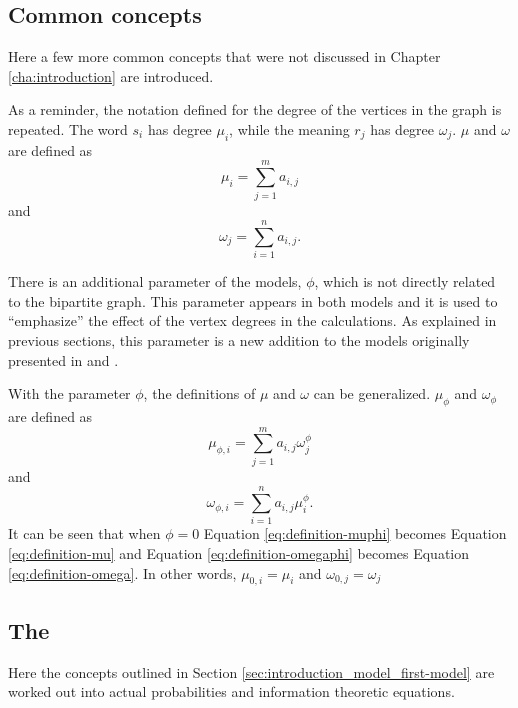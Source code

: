 \subsection{Common concepts}
\label{sec:model_math_graph}

Here a few more common concepts that were not discussed in Chapter \ref{cha:introduction} are introduced.

As a reminder, the notation defined for the degree of the vertices in the graph is repeated.
The word $s_i$ has degree $\mu_i$, while the meaning $r_j$ has degree $\omega_j$.
$\mu$ and $\omega$ are defined as
\begin{equation}
  \label{eq:definition-mu}
  \mu_i = \sum_{j=1}^m a_{i,j}
\end{equation}
and
\begin{equation}
  \label{eq:definition-omega}
  \omega_j = \sum_{i=1}^n a_{i,j}.
\end{equation}

There is an additional parameter of the models, $\phi$, which is not directly related to the bipartite graph.
This parameter appears in both models and it is used to ``emphasize'' the effect of the vertex degrees in the calculations.
As explained in previous sections, this parameter is a new addition to the models originally presented in \cite{Ferrer2005a} and \cite{Ferrer2003a}.

With the parameter $\phi$, the definitions of $\mu$ and $\omega$ can be generalized.
$\mu_\phi$ and $\omega_\phi$ are defined as
\begin{equation}
  \label{eq:definition-muphi}
  \mu_{\phi,i} = \sum_{j=1}^m a_{i,j} \omega_j^\phi
\end{equation}
and
\begin{equation}
  \label{eq:definition-omegaphi}
  \omega_{\phi,i} = \sum_{i=1}^n a_{i,j} \mu_i^\phi.
\end{equation}
It can be seen that when $\phi=0$ Equation \eqref{eq:definition-muphi} becomes Equation \eqref{eq:definition-mu} and Equation \eqref{eq:definition-omegaphi} becomes Equation \eqref{eq:definition-omega}.
In other words, $\mu_{0,i} = \mu_i$ and $\omega_{0,j} = \omega_j$

\subsection{The \firstmodel{}}
\label{sec:model_math_first-model}

Here the concepts outlined in Section \ref{sec:introduction_model_first-model} are worked out into actual probabilities and information theoretic equations.

